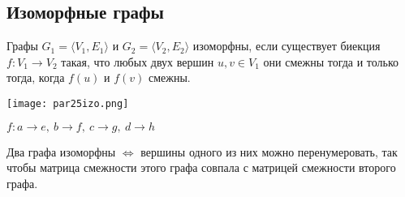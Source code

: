 \subsection{Изоморфные графы}

\begin{defn}
    Графы $G_1 = \langle V_1, E_1 \rangle$ и $G_2 = \langle V_2, E_2 \rangle$ изоморфны, если существует биекция $f : V_1 \to V_2$ такая, что любых двух вершин $u, v \in V_1$ они смежны тогда и только тогда, когда $f(u)$ и $f(v)$ смежны.
\end{defn}

\begin{center}
    \texttt{[image: par25izo.png]}
\end{center}

$f : a \to e,~b \to f,~c \to g,~d \to h$

\begin{statement}
    Два графа изоморфны $\iff$ вершины одного из них можно перенумеровать, так чтобы матрица смежности этого графа совпала с матрицей смежности второго графа.
\end{statement}